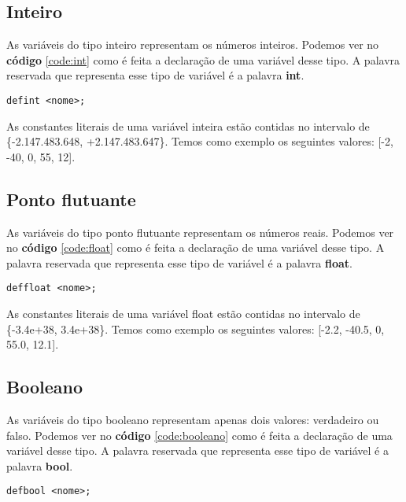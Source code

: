 \documentclass[
  12pt,				%
  oneside,			%
  a4paper,			%
  english,			%
  french,				%
  spanish,			%
  brazil,				%
]{abntex2}
\begin{document}
\subsection{Inteiro}
\label{subsec:inteiro}
As variáveis do tipo inteiro representam os números inteiros. Podemos
ver no \textbf{código} \ref{code:int} como é feita a declaração de uma
variável desse tipo. A palavra reservada que representa esse tipo de
variável é a palavra \textbf{int}.

\begin{lstlisting}[label=code:int,caption=Declaração de uma variável inteira]
  defint <nome>;
\end{lstlisting}


As constantes literais de uma variável inteira estão contidas no
intervalo de
\\
\{-2.147.483.648, +2.147.483.647\}. Temos como exemplo
os seguintes valores: [-2, -40, 0, 55, 12].

\subsection{Ponto flutuante}
\label{subsec:ponto-flutuante}
As variáveis do tipo ponto flutuante representam os números
reais. Podemos ver no \textbf{código} \ref{code:float} como
é feita a declaração de uma variável desse tipo. A palavra reservada
que representa esse tipo de variável é a palavra \textbf{float}.

\begin{lstlisting}[label=code:float,caption=Declaração de uma variável
  tipo ponto flutuante.]
  deffloat <nome>;
\end{lstlisting}

As constantes literais de uma variável float estão contidas no
intervalo de
\\
\{-3.4e+38, 3.4e+38\}. Temos como exemplo
os seguintes valores: [-2.2, -40.5, 0, 55.0, 12.1].

\subsection{Booleano}
\label{subsec:booleano}
As variáveis do tipo booleano representam apenas dois
valores: verdadeiro ou falso. Podemos ver no \textbf{código}
\ref{code:booleano} como é feita a declaração de uma variável desse
tipo. A palavra reservada que representa esse tipo de variável é a palavra \textbf{bool}.

\begin{lstlisting}[label=code:booleano,caption=Declaração de uma variável booleana]
  defbool <nome>;
\end{lstlisting}
\end{document}
